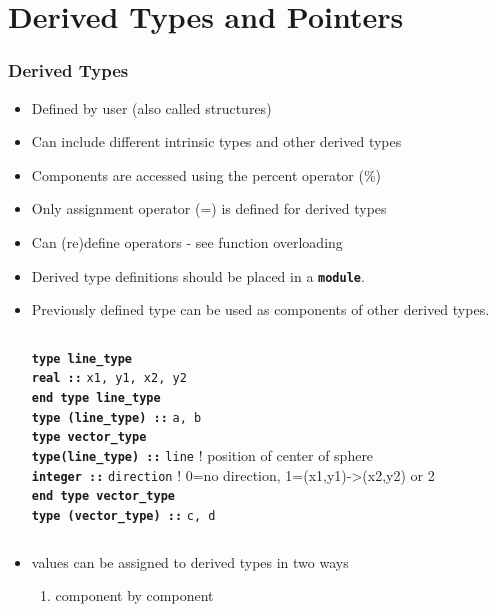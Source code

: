 \documentclass[slidestop,mathserif,compress,xcolor=svgnames]{beamer}
\newcommand{\bftt}[1]{\textbf{\texttt{#1}}}
\newenvironment{bblock}[0]
{
\begin{beamerboxesrounded}[upper=uppercol1,lower=lowercol1,shadow=true]}
{\end{beamerboxesrounded}}
\begin{document}
\section{Derived Types and Pointers}
\begin{frame}
  \frametitle{\small Derived Types}
  \begin{itemize}
    \item Defined by user (also called structures)
    \item Can include different intrinsic types and other derived types
    \item Components are accessed using the percent operator (\%)
    \item Only assignment operator (=) is defined for derived types
    \item Can (re)define operators - see function overloading
    \item Derived type definitions should be placed in a \textbf{\texttt{module}}.
    \item Previously defined type can be used as components of other derived types.
    {\tiny
      \begin{columns}
        \column{6.5cm}
        \begin{bblock}{}
          \begin{tabbing}
            \bftt{ty}\=\bftt{pe line\_type} \\
            \> \bftt{real ::} \texttt{x1, y1, x2, y2} \\
            \bftt{end type line\_type} \\
            \bftt{type (line\_type) ::} \texttt{a, b} \\
            \bftt{type vector\_type} \\
            \> \bftt{type(line\_type) ::} \texttt{line} ! position of center of sphere\\
            \> \bftt{integer ::} \texttt{direction} ! 0=no direction, 1=(x1,y1)->(x2,y2) or 2\\
            \bftt{end type vector\_type} \\
            \bftt{type (vector\_type) ::} \texttt{c, d}
          \end{tabbing}
        \end{bblock}
      \end{columns}
    }
    \framebreak
    \item values can be assigned to derived types in two ways
    \begin{enumerate}
      \item component by component

\end{enumerate}
\end{itemize}
\end{frame}
\end{document}
